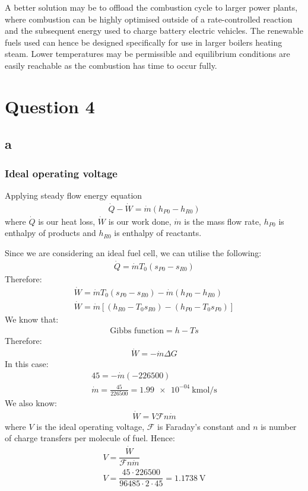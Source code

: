 \documentclass[11pt]{article}
\numberwithin{equation}{section}
\begin{document}
A better solution may be to offload the combustion cycle to larger power plants, where combustion can be highly optimised outside of a rate-controlled reaction and the subsequent energy used to charge battery electric vehicles. The renewable fuels used can hence be designed specifically for use in larger boilers heating steam. Lower temperatures may be permissible and equilibrium conditions are easily reachable as the combustion has time to occur fully.  

\section{Question 4}
\subsection{a}
\subsubsection{Ideal operating voltage}
Applying steady flow energy equation
\begin{gather}
    \dot{Q} - \dot{W} = \dot{m}\left(h_{P0} - h_{R0}\right)
\end{gather}
where $\dot{Q}$ is our heat loss, $\dot{W}$ is our work done, $\dot{m}$ is the mass flow rate, $h_{P0}$ is enthalpy of products and $h_{R0}$ is enthalpy of reactants. 

Since we are considering an ideal fuel cell, we can utilise the following:
\begin{gather}
    \dot{Q} = \dot{m}T_0\left(s_{P0} - s_{R0}\right)
\end{gather}
Therefore:
\begin{gather}
    \dot{W} = \dot{m}T_0 \left(s_{P0} - s_{R0}\right) - \dot{m}\left(h_{P0}-h_{R0}\right)\\
    \dot{W} = \dot{m}\left[\left(h_{R0} - T_0s_{R0}\right)-\left(h_{P0}-T_0s_{P0}\right)\right]
\end{gather}
We know that:
\begin{gather}
    \textrm{Gibbs function} = h- Ts
\end{gather}
Therefore:
\begin{gather}
    \dot{W} = -\dot{m}\Delta G  
\end{gather}
In this case:
\begin{gather}
    45 = - \dot{m} \left(-226500\right)\\
    \dot{m} = \frac{45}{226500} = \SI{1.99e-04}{\kilo\mol\per\second}
\end{gather}
We also know:
\begin{gather}
    \dot{W} = V\mathcal{F}n\dot{m}
\end{gather}
where $V$ is the ideal operating voltage, $\mathcal{F}$ is Faraday's constant and $n$ is number of charge transfers per molecule of fuel. Hence:
\begin{gather}
    V = \dfrac{\dot{W}}{\mathcal{F}n\dot{m}}\\
    V = \dfrac{45\cdot 226500}{96485\cdot 2 \cdot 45} = \SI{1.1738}{\volt}
\end{gather}
\end{document}
